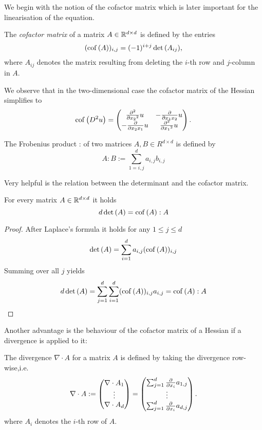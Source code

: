 We begin with the notion of the cofactor matrix which is later important for the linearisation of the \MA equation.
\begin{definition} \label{def: cof matrix}
	The \emph{cofactor matrix} of a matrix $A \in \mathbb{R}^{d \times d}$ is defined by the entries
	\begin{align}
	(\operatorname{cof} \left( A \right) )_{i,j} = (-1)^{i+j} \det{\left(A_{ij}\right)},
	\end{align}
	where $A_{ij}$ denotes the matrix resulting from deleting the $i$-th row and $j$-column in $A$.
\end{definition}

We observe that in the two-dimensional case the cofactor matrix of the Hessian simplifies to
\begin{align}
\operatorname{cof} \left( D^2 u \right) = \begin{pmatrix}
								\frac {\partial^2} {\partial {x_2}^2} u & -\frac {\partial }{\partial x_1 x_2} u\\
								-\frac {\partial }{\partial x_2 x_1} u & \frac {\partial^2} {\partial {x_1}^2} u
							\end{pmatrix}.
\end{align}

\begin{definition} \label{def: frobenius product}
	The Frobenius product : of two matrices $A, B \in R^{d \times d}$ is defined by
	\[
		A:B := \sum_{1 = i,j} ^d a_{i,j} b_{i,j}
	\]
\end{definition}

Very helpful is the relation between the determinant and the cofactor matrix.
\begin{lemma}\label{la: rel det cofactor}
	For every matrix $A  \in \mathbb{R}^{d \times d}$ it holds
	\[
		d \det{\left(A\right)} = \operatorname{cof} \left( A \right): A
	\]
\end{lemma}
\begin{proof}
	After Laplace's formula it holds for any $1 \leq j \leq d$
	\[
		\det{\left(A\right)} = \sum\limits_{i = 1}^{d} a_{i,j} (\operatorname{cof} \left( A \right) )_{i,j} 
	\]
	Summing over all $j$ yields
	\[
		d \det{\left(A\right)} = \sum\limits_{j= 1}^{d} \sum\limits_{i = 1}^{d} (\operatorname{cof} \left( A \right) )_{i,j}  a_{i,j}  = \operatorname{cof} \left( A \right): A
	\]
\end{proof}

Another advantage is the behaviour of the cofactor matrix of a Hessian if a divergence is applied to it:
\begin{definition}
The divergence $\nabla \cdot A$ for a matrix $A$ is defined by taking the divergence row-wise,i.e.
\[
	\nabla \cdot A := \begin{pmatrix} \nabla \cdot A_1 \\ \vdots \\ \nabla \cdot A_d\end{pmatrix}
	= \begin{pmatrix} \sum_{j = 1}^{d} \frac \partial {\partial x_i} a_{1,j} \\ \vdots \\ \sum_{j = 1}^{d} \frac \partial {\partial x_i} a_{d,j}\end{pmatrix}.
\]
where $A_i$ denotes the $i$-th row of $A$.
	
\end{definition}

